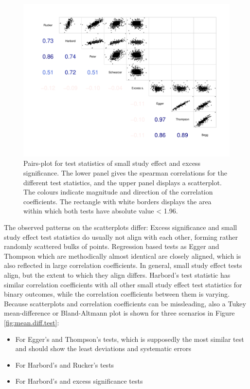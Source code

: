 \documentclass[11pt,a4paper,twoside]{book}\usepackage[]{graphicx}\usepackage[]{color}
\newenvironment{knitrout}{}{} %
\begin{document}
\begin{figure}
\begin{knitrout}
\color{fgcolor}

{\centering \includegraphics[width=\textwidth-3cm]{figure/ch03_figunnamed-chunk-11-1} 

}



\end{knitrout}
\caption{Pairs-plot for test statistics of small study effect and excess significance. The lower panel gives the spearman correlations for the different test statistics, and the upper panel displays a scatterplot. The colours indicate magnitude and direction of the correlation coefficients. The rectangle with white borders displays the area within which both tests have absolute value < 1.96.}
\label{fig:test.agreement}
\end{figure}

The observed patterns on the scatterplots differ: Excess significance and small study effect test statistics do usually not align with each other, forming rather randomly scattered bulks of points. Regression based tests as Egger and Thompson which are methodically almost identical are closely aligned, which is also reflected in large correlation coefficients. In general, small study effect tests align, but the extent to which they align differs. Harbord's test statistic has similar correlation coefficients with all other small study effect test statistics for binary outcomes, while the correlation coefficients between them is varying.\\
Because scatterplots and correlation coefficients can be missleading, also a Tukey mean-difference or Bland-Altmann plot is shown for three scenarios in Figure \ref{fig:mean.diff.test}:
\begin{itemize}
\item For Egger's and Thompson's tests, which is supposedly the most similar test and should show the least deviations and systematic errors
\item For Harbord's and Rucker's tests
\item For Harbord's and excess significance tests
\end{itemize}
\end{document}
